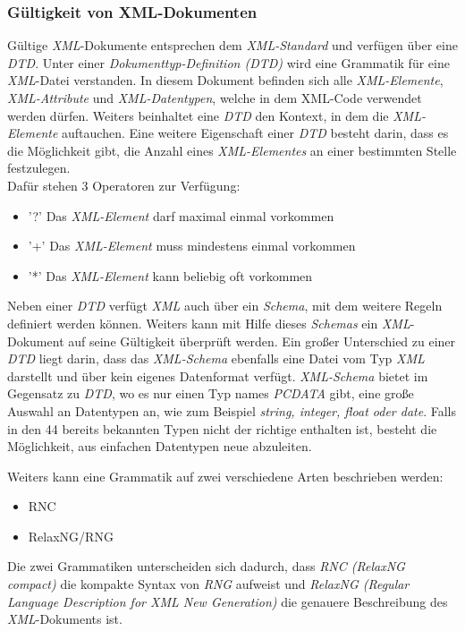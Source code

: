 \subsubsection{Gültigkeit von XML-Dokumenten}
\pra
\noindent
Gültige \textit{XML}-Dokumente entsprechen dem \textit{XML-Standard} und verfügen über eine \textit{DTD}. Unter einer \textit{Dokumenttyp-Definition (DTD)} wird eine Grammatik für eine \textit{XML}-Datei verstanden. In diesem Dokument befinden sich alle \textit{XML-Elemente}, \textit{XML-Attribute} und \textit{XML-Datentypen}, welche in dem XML-Code verwendet werden dürfen. Weiters beinhaltet eine \textit{DTD} den Kontext, in dem die \textit{XML-Elemente} auftauchen. Eine weitere Eigenschaft einer \textit{DTD} besteht darin, dass es die Möglichkeit gibt, die Anzahl eines \textit{XML-Elementes} an einer bestimmten Stelle festzulegen. \footnotemark[10]
\\

\noindent
Dafür stehen 3 Operatoren zur Verfügung:
\begin{itemize}
	\item{'?'} Das \textit{XML-Element} darf maximal einmal vorkommen
	\item{'+'} Das \textit{XML-Element} muss mindestens einmal vorkommen
	\item{'*'} Das \textit{XML-Element} kann beliebig oft vorkommen
\end{itemize}

\noindent
Neben einer \textit{DTD} verfügt \textit{XML} auch über ein \textit{Schema}, mit dem weitere Regeln definiert werden können. Weiters kann mit Hilfe dieses \textit{Schemas} ein \textit{XML}-Dokument auf seine Gültigkeit überprüft werden. Ein großer Unterschied zu einer \textit{DTD} liegt darin, dass das \textit{XML-Schema} ebenfalls eine Datei vom Typ \textit{XML} darstellt und über kein eigenes Datenformat verfügt. \textit{XML-Schema} bietet im Gegensatz zu \textit{DTD}, wo es nur einen Typ names \textit{PCDATA} gibt, eine große Auswahl an Datentypen an, wie zum Beispiel \textit{string, integer, float oder date}. Falls in den 44 bereits bekannten Typen nicht der richtige enthalten ist, besteht die Möglichkeit, aus einfachen Datentypen neue abzuleiten.\footnotemark[10]
\\
\pra

\noindent
Weiters kann eine Grammatik auf zwei verschiedene Arten beschrieben werden:
\begin{itemize}
	\item{RNC} 
	\item{RelaxNG/RNG} 
\end{itemize}
Die zwei Grammatiken unterscheiden sich dadurch, dass \textit{RNC (RelaxNG compact)} die kompakte Syntax von \textit{RNG} aufweist und \textit{RelaxNG (Regular Language Description for XML New Generation)} die genauere Beschreibung des \textit{XML}-Dokuments ist.
\\

